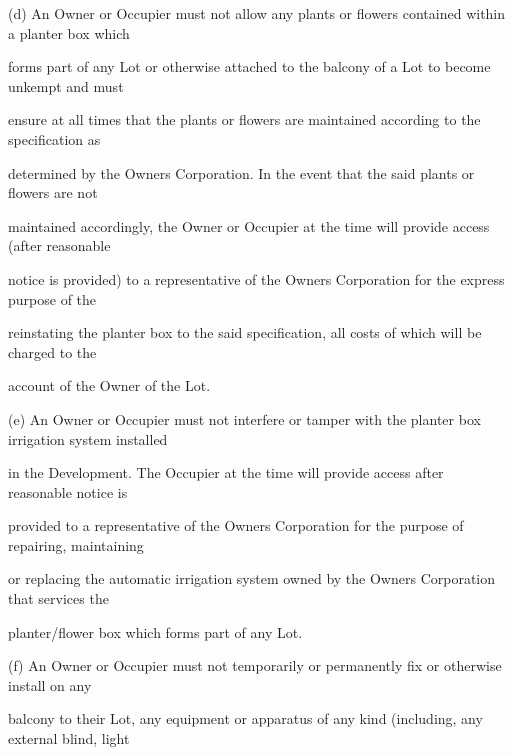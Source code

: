 \documentclass{article}
\begin{document}
{\fontsize{9.962}{1}(d) An Owner or Occupier must not allow any plants or flowers contained within a planter box which }

{\fontsize{10.02}{1}forms part of any Lot or otherwise attached to the balcony of a Lot to become unkempt and must }

{\fontsize{10.02}{1}ensure at all times that the plants or flowers are maintained according to the specification as }

{\fontsize{10.02}{1}determined by the Owners Corporation. In the event that the said plants or flowers are not }

{\fontsize{10.02}{1}maintained accordingly, the Owner or Occupier at the time will provide access (after reasonable }

{\fontsize{10.02}{1}notice is provided) to a representative of the Owners Corporation for the express purpose of the }

{\fontsize{10.02}{1}reinstating the planter box to the said specification, all costs of which will be charged to the }

{\fontsize{10.02}{1}account of the Owner of the Lot. }

{\fontsize{9.962}{1}(e) An Owner or Occupier must not interfere or tamper with the planter box irrigation system installed }

{\fontsize{10.02}{1}in the Development. The Occupier at the time will provide access after reasonable notice is }

{\fontsize{10.02}{1}provided to a representative of the Owners Corporation for the purpose of repairing, maintaining }

{\fontsize{10.02}{1}or replacing the automatic irrigation system owned by the Owners Corporation that services the }

\newpage


















{\fontsize{10.02}{1}planter/flower box which forms part of any Lot. }

{\fontsize{9.962}{1}(f) An Owner or Occupier must not temporarily or permanently fix or otherwise install on any }

{\fontsize{10.02}{1}balcony to their Lot, any equipment or apparatus of any kind (including, any external blind, light }
\end{document}
